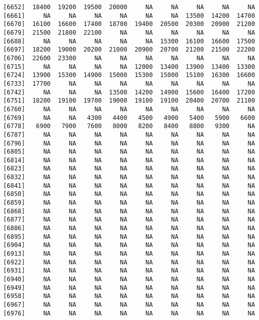 \documentclass[]{article}
\begin{document}
\begin{verbatim}
 [6652]  18400  19200  19500  20000     NA     NA     NA     NA     NA
 [6661]     NA     NA     NA     NA     NA     NA  13500  14200  14700
 [6670]  16100  16600  17400  18700  19400  20500  20300  20900  21200
 [6679]  21500  21800  22100     NA     NA     NA     NA     NA     NA
 [6688]     NA     NA     NA     NA     NA  15300  16100  16600  17500
 [6697]  18200  19000  20200  21000  20900  20700  21200  21500  22200
 [6706]  22600  23300     NA     NA     NA     NA     NA     NA     NA
 [6715]     NA     NA     NA     NA  12000  13400  13900  13400  13300
 [6724]  13900  15300  14900  15000  15300  15000  15100  16300  16600
 [6733]  17700     NA     NA     NA     NA     NA     NA     NA     NA
 [6742]     NA     NA     NA  13500  14200  14900  15600  16400  17200
 [6751]  18200  19100  19700  19000  19100  19100  20400  20700  21100
 [6760]     NA     NA     NA     NA     NA     NA     NA     NA     NA
 [6769]     NA     NA   4300   4400   4500   4900   5400   5900   6600
 [6778]   6900   7900   7600   8000   8200   8400   8800   9300     NA
 [6787]     NA     NA     NA     NA     NA     NA     NA     NA     NA
 [6796]     NA     NA     NA     NA     NA     NA     NA     NA     NA
 [6805]     NA     NA     NA     NA     NA     NA     NA     NA     NA
 [6814]     NA     NA     NA     NA     NA     NA     NA     NA     NA
 [6823]     NA     NA     NA     NA     NA     NA     NA     NA     NA
 [6832]     NA     NA     NA     NA     NA     NA     NA     NA     NA
 [6841]     NA     NA     NA     NA     NA     NA     NA     NA     NA
 [6850]     NA     NA     NA     NA     NA     NA     NA     NA     NA
 [6859]     NA     NA     NA     NA     NA     NA     NA     NA     NA
 [6868]     NA     NA     NA     NA     NA     NA     NA     NA     NA
 [6877]     NA     NA     NA     NA     NA     NA     NA     NA     NA
 [6886]     NA     NA     NA     NA     NA     NA     NA     NA     NA
 [6895]     NA     NA     NA     NA     NA     NA     NA     NA     NA
 [6904]     NA     NA     NA     NA     NA     NA     NA     NA     NA
 [6913]     NA     NA     NA     NA     NA     NA     NA     NA     NA
 [6922]     NA     NA     NA     NA     NA     NA     NA     NA     NA
 [6931]     NA     NA     NA     NA     NA     NA     NA     NA     NA
 [6940]     NA     NA     NA     NA     NA     NA     NA     NA     NA
 [6949]     NA     NA     NA     NA     NA     NA     NA     NA     NA
 [6958]     NA     NA     NA     NA     NA     NA     NA     NA     NA
 [6967]     NA     NA     NA     NA     NA     NA     NA     NA     NA
 [6976]     NA     NA     NA     NA     NA     NA     NA     NA     NA

\end{verbatim}
\end{document}
